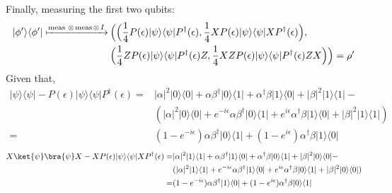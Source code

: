 Finally, measuring the first two qubits:
\begin{equation}
\begin{split}
  |\phi'\rangle \langle \phi'|  \xmapsto{ \text{meas }  \otimes \hspace{1pt} \text{meas} \hspace{1pt}  \otimes \hspace{1pt} I} \hspace{2pt}& \Big(\Big(\frac{1}{4} P(\epsilon)|\psi\rangle \langle \psi| P^{\dag}(\epsilon), \frac{1}{4} XP(\epsilon)|\psi\rangle \langle \psi|XP^{\dag}(\epsilon)\Big),\\
  &\Big(\frac{1}{4} ZP(\epsilon)|\psi\rangle \langle \psi|P^{\dag}(\epsilon)Z, \frac{1}{4}  XZP(\epsilon)|\psi\rangle \langle \psi|P^{\dag}(\epsilon)ZX \Big)\Big) = \rho'\\
\end{split}
\end{equation}
Given that,
\begin{equation}
  \begin{split}
    |\psi\rangle \langle \psi|- P(\epsilon)|\psi\rangle \langle \psi| P^{\dag}(\epsilon)= & |\alpha|^{2} |0\rangle \langle 0 | + \alpha \beta^{\dag} |0\rangle \langle 1 | + \alpha^{\dag} \beta |1\rangle \langle 0 | + |\beta|^{2} |1\rangle \langle 1 |  - \\
    & (|\alpha|^{2} |0\rangle \langle 0| + e^{-i\epsilon}\alpha \beta^{\dag} |0\rangle \langle 1 | + e^{i\epsilon} \alpha^{\dag} \beta |1\rangle \langle 0 | + |\beta|^{2} |1\rangle \langle 1 |)\\
 = & (1-e^{-i\epsilon}) \alpha \beta^{\dag} |0\rangle \langle 1 | + (1-e^{i\epsilon}) \alpha^{\dag} \beta |1\rangle \langle 0 | 
  \end{split}
\end {equation}
\begin{equation}
  \begin{split}
    X\ket{\psi}\bra{\psi}X - XP(\epsilon)|\psi\rangle \langle \psi|XP^{\dag}(\epsilon) = & |\alpha|^{2} |1\rangle \langle 1 | + \alpha \beta^{\dag} |1\rangle \langle 0 | + \alpha^{\dag} \beta |0\rangle \langle 1 | + |\beta|^{2} |0\rangle \langle 0 |  - \\
    & (|\alpha|^{2} |1\rangle \langle 1| + e^{-i\epsilon}\alpha \beta^{\dag} |1\rangle \langle 0 | + e^{i\epsilon} \alpha^{\dag} \beta |0\rangle \langle 1 | + |\beta|^{2} |0\rangle \langle 0 |)\\
  = & (1-e^{-i\epsilon}) \alpha \beta^{\dag} |1\rangle \langle 0 | + (1-e^{i\epsilon}) \alpha^{\dag} \beta |0\rangle \langle 1 |
  \end{split}
\end {equation}
